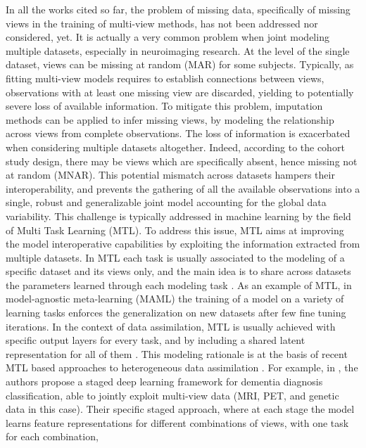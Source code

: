 In all the works cited so far, the problem of missing data, specifically of missing views in the training of multi-view methods, has not been addressed nor considered, yet.
It is actually a very common problem when joint modeling multiple datasets, especially in neuroimaging research.
At the level of the single dataset, views can be missing at random (MAR) for some subjects.
Typically, as fitting multi-view models requires to establish connections between views, observations with at least one missing view are discarded, yielding to potentially severe loss of available information.
To mitigate this problem, imputation methods can be applied to infer missing views, by modeling the relationship across views from complete observations.
%
The loss of information is exacerbated when considering multiple datasets altogether.
Indeed, according to the cohort study design, there may be views which are specifically absent, hence missing not at random (MNAR).
This potential mismatch across datasets hampers their interoperability,
and prevents the gathering of all the available observations into a single, robust and generalizable joint model accounting for the global data variability.
%
This challenge is typically addressed in machine learning by the field of Multi Task Learning (MTL).
To address this issue, MTL aims at improving the model interoperative capabilities by exploiting the information extracted from multiple datasets.
In MTL each task is usually associated to the modeling of a specific dataset and its views only,
and the main idea is to share across datasets the parameters learned through each modeling task \citep{Caruana1998, Dorado-Moreno2020}.
As an example of MTL, in model-agnostic meta-learning (MAML) \citep{MAML1} the training of a model on a variety of learning tasks enforces the generalization on new datasets after few fine tuning iterations.
%
In the context of data assimilation, MTL is usually achieved with specific output layers for every task, and by including a shared latent representation for all of them \citep{Dorado-Moreno2020}.
This modeling rationale is at the basis of recent MTL based approaches to heterogeneous data assimilation \citep{Wu2018, Shi2019}.
For example, in \cite{Zhou2019a}, the authors propose a staged deep learning framework for dementia diagnosis classification,
able to jointly exploit multi-view data (MRI, PET, and genetic data in this case).
Their specific staged approach, where at each stage the model learns feature representations for different combinations of views, with one task for each combination,
